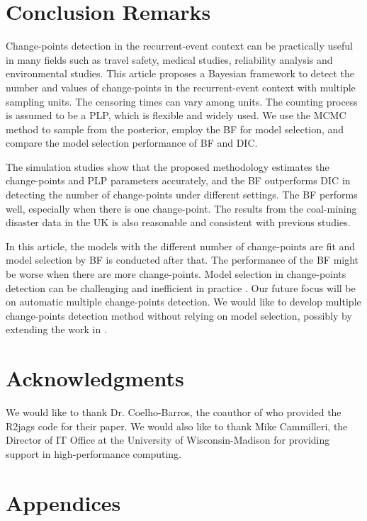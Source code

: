 \documentclass[12pt]{article}
\numberwithin{equation}{section}
\begin{document}
\section{Conclusion Remarks}\label{sec:discussion}
Change-points detection in the recurrent-event context can be practically useful in many fields such as travel safety, medical studies, reliability analysis and environmental studies.  This article proposes a Bayesian framework to detect the number and values of change-points in the recurrent-event context with multiple sampling units. The censoring times can vary among units. The counting process is assumed to be a PLP, which is flexible and widely used.  We use the MCMC method to sample from the posterior, employ the BF for model selection, and compare the model selection performance of BF and DIC. 

The simulation studies show that the proposed methodology estimates the change-points and PLP parameters accurately, and the BF outperforms DIC in detecting the number of change-points under different settings.  The BF performs well, especially when there is one change-point. The results from the coal-mining disaster data in the UK is also reasonable and consistent with previous studies.

In this article, the models with the different number of change-points are fit and model selection by BF is conducted after that. The performance of the BF might be worse when there are more change-points.  Model selection in change-points detection can be challenging and inefficient in practice \citep{Ruggieri2013}. Our future focus will be on automatic multiple change-points detection. We would like to develop multiple change-points detection method without relying on model selection, possibly by extending the work in \citet{Ruggieri2013}. 


\section{Acknowledgments}
We would like to thank Dr. Coelho-Barros, the coauthor of \citet{Achcar2016} who provided the R2jags code for their paper. We would also like to thank Mike Cammilleri, the Director of IT Office at the University of Wisconsin-Madison for providing support in high-performance computing.


\section*{Appendices}
\end{document}
